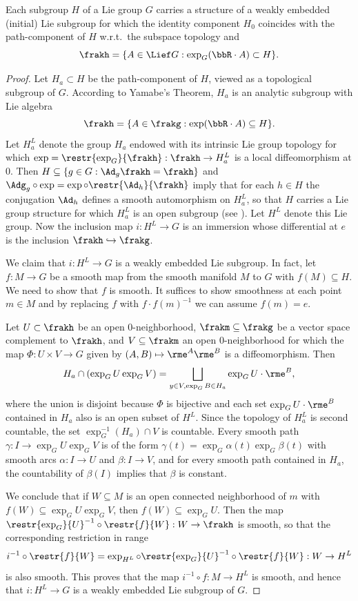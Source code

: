 \begin{thm}\label{thm initial subgroup}
    Each subgroup $H$ of a Lie group $G$ carries a structure of a weakly embedded (initial) Lie subgroup for which the identity component $H_0$ coincides with the path-component of $H$ w.r.t.\ the subspace topology and
    \[\frakh=\{A\in\Lief G: \exp_G(\bbR\cdot A)\subset H\}.\]
\end{thm}
\begin{proof}
    Let $H_a\subset H$ be the path-component of $H$, viewed as a topological subgroup of $G$. According to Yamabe's Theorem, $H_a$ is an analytic subgroup with Lie algebra
    \[\frakh=\{A\in\frakg:\exp(\bbR\cdot A)\subseteq H\}.\]
    Let $H_a^L$ denote the group $H_a$ endowed with its intrinsic Lie group topology for which $\exp=\restr{\exp_G}{\frakh}:\frakh\to H_a^L$ is a local diffeomorphism at $0$. Then $H\subseteq\{g\in G:\Ad_g\frakh=\frakh\}$ and $\Adg_g\circ \exp=\exp\circ\restr{\Ad_h}{\frakh}$ imply that for each $h\in H$ the conjugation $\Ad_h$ defines a smooth automorphism on $H_a^L$, so that $H$ carries a Lie group structure for which $H_a^L$ is an open subgroup (see \cite[Thm.~9.4.4, Cor.~9.4.5]{HN}). Let $H^L$ denote this Lie group. Now the inclusion map $i:H^L\to G$ is an immersion whose differential at $e$ is the inclusion $\frakh\hookrightarrow\frakg$.

    We claim that $i:H^L\to G$ is a weakly embedded Lie subgroup. In fact, let $f:M\to G$ be a smooth map from the smooth manifold $M$ to $G$ with $f(M)\subseteq H$. We need to show that $f$ is smooth. It suffices to show smoothness at each point $m\in M$ and by replacing $f$ with $f\cdot f(m)^{-1}$ we can assume $f(m)=e$.

    Let $U\subset \frakh$ be an open 0-neighborhood, $\frakm\subseteq\frakg$ be a vector space complement to $\frakh$, and $V\subseteq \frakm$ an open 0-neighborhood for which the map $\Phi:U\times V\to G$ given by $(A,B)\mapsto \rme^A\rme^B$ is a diffeomorphism. Then 
    \[H_a\cap(\exp_G U\exp_G V)=\bigsqcup_{y\in V,\exp_G B\in H_a}\exp_GU \cdot \rme^B,\]
    where the union is disjoint because $\Phi$ is bijective and each set $\exp_GU\cdot \rme^B$ contained in $H_a$ also is an open subset of $H^L$. Since the topology of $H^L_a$ is second countable, the set $\exp^{-1}_G(H_a)\cap V$ is countable. Every smooth path $\gamma:I\to \exp_GU\exp_GV$ is of the form $\gamma(t)=\exp_G\alpha(t)\exp_G\beta(t)$ with smooth arcs $\alpha:I\to U$ and $\beta:I\to V$, and for every smooth path contained in $H_a$, the countability of $\beta(I)$ implies that $\beta$ is constant.

    We conclude that if $W\subseteq M$ is an open connected neighborhood of $m$ with $f(W)\subseteq \exp_GU\exp_GV$, then $f(W)\subseteq \exp_GU$. Then the map $\restr{\exp_G}{U}^{-1}\circ \restr{f}{W}:W\to\frakh$ is smooth, so that the corresponding restriction in range
    \[i^{-1}\circ \restr{f}{W}=\exp_{H^L}\circ \restr{\exp_G}{U}^{-1}\circ \restr{f}{W}:W\to H^L\]
    is also smooth. This proves that the map $i^{-1}\circ f:M\to H^L$ is smooth, and hence that $i:H^L\to G$ is a weakly embedded Lie subgroup of $G$.
\end{proof}

